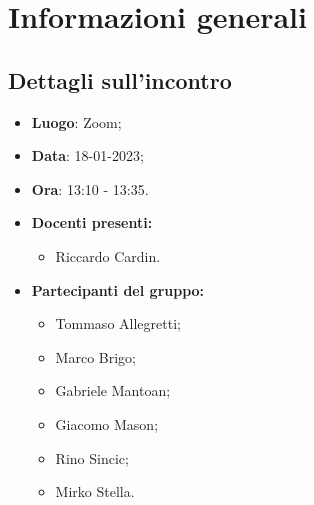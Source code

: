 \section{Informazioni generali}

\subsection{Dettagli sull'incontro}
\begin{itemize}
    \item \textbf{Luogo}: Zoom;
    \item \textbf{Data}: 18-01-2023;
    \item \textbf{Ora}: 13:10 - 13:35.
    \item \textbf{Docenti presenti:}
        \begin{itemize}
            \item Riccardo Cardin.
        \end{itemize}
    \item \textbf{Partecipanti del gruppo:}
        \begin{itemize}
            \item Tommaso Allegretti;
            \item Marco Brigo;
            \item Gabriele Mantoan;
            \item Giacomo Mason;
            \item Rino Sincic;
            \item Mirko Stella.
        \end{itemize}
\end{itemize}


